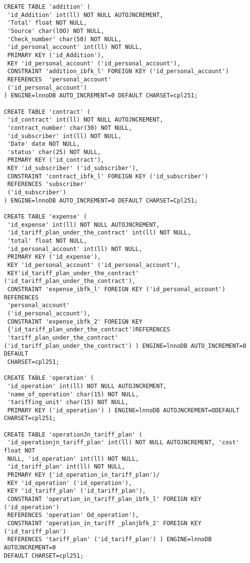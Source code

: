 \begin{verbatim}
CREATE TABLE 'addition' (
 'id_Addition' int(ll) NOT NULL AUTOJNCREMENT,
 'Total' float NOT NULL,
 'Source' char(lOO) NOT NULL,
 'Check_number' char(50) NOT NULL,
 'id_personal_account' int(ll) NOT NULL,
 PRIMARY KEY ('id_Addition'),
 KEY 'id_personal_account' ('id_personal_account'),
 CONSTRAINT 'addition_ibfk_l' FOREIGN KEY ('id_personal_account')
 REFERENCES  'personal_account'
 ('id_personal_account') 
) ENGINE=lnnoDB AUTO_INCREMENT=0 DEFAULT CHARSET=cpl251;

CREATE TABLE 'contract' (
 'id_contract' int(ll) NOT NULL AUTOJNCREMENT,
 'contract_number' char(30) NOT NULL,
 'id_subscriber' int(ll) NOT NULL,
 'Date' date NOT NULL,
 'status' char(25) NOT NULL,
 PRIMARY KEY ('id_contract'),
 KEY 'id_subscriber' ('id_subscriber'),
 CONSTRAINT 'contract_ibfk_l' FOREIGN KEY ('id_subscriber') 
 REFERENCES 'subscriber' 
 ('id_subscriber')
) ENGINE=lnnoDB AUTO_INCREMENT=0 DEFAULT CHARSET=Cpl251;

CREATE TABLE 'expense' (
 'id_expense' int(ll) NOT NULL AUTOJNCREMENT,
 'id_tariff_plan_under_the_contract' int(ll) NOT NULL,
 'total' float NOT NULL,
 'id_personal_account' int(ll) NOT NULL,
 PRIMARY KEY ('id_expense'),
 KEY 'id_personal_account' ('id_personal_account'),
 KEY'id_tariff_plan_under_the_contract' ('id_tariff_plan_under_the_contract'),
 CONSTRAINT 'expense_ibfk_l' FOREIGN KEY ('id_personal_account') REFERENCES
 'personal_account'
 ('id_personal_account'),
 CONSTRAINT 'expense_ibfk_2' FOREIGN KEY  
 {'id_tariff_plan_under_the_contract')REFERENCES
 'tariff_plan_under_the_contract'
('id_tariff_plan_under_the_contract') ) ENGINE=lnnoDB AUTO_INCREMENT=0 DEFAULT
 CHARSET=cpl251;

CREATE TABLE 'operation' (
 'id_operation' int(ll) NOT NULL AUTOJNCREMENT,
 'name_of_operation' char(15) NOT NULL,
 'tariffing_unit' char(15) NOT NULL,
 PRIMARY KEY ('id_operation') ) ENGINE=lnnoDB AUTOJNCREMENT=ODEFAULT 
CHARSET=cpl251;

CREATE TABLE 'operationJn_tariff_plan' (
 'id_operationjn_tariff_plan' int(ll) NOT NULL AUTOJNCREMENT, 'cost' float NOT
 NULL, 'id_operation' int(ll) NOT NULL,
 'id_tariff_plan' int(ll) NOT NULL,
 PRIMARY KEY {'id_operation_in_tariff_plan')/
 KEY 'id_operation' ('id_operation'),
 KEY 'id_tariff_plan' ('id_tariff_plan'),
 CONSTRAINT 'operation_in_tariff_plan_ibfk_l' FOREIGN KEY ('id_operation') 
 REFERENCES 'operation' Od_operation'),
 CONSTRAINT 'operation_in_tariff _planjbfk_2' FOREIGN KEY ('id_tariff_plan')
 REFERENCES 'tariff_plan' ('id_tariff_plan') ) ENGINE=lnnoDB AUTOJNCREMENT=0
DEFAULT CHARSET=cpl251;


\end{verbatim}
